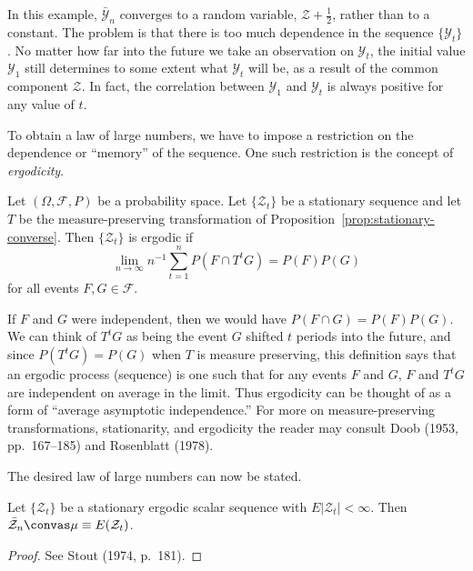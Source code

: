 In this example, $\bar{\mathcal{Y}}_n$ converges to a random variable, $\mathcal{Z} + \frac{1}{2}$, rather than to a constant. The problem is that there is too much dependence in the sequence $\{\mathcal{Y}_t\}$. No matter how far into the future we take an observation on $\mathcal{Y}_t$, the initial value $\mathcal{Y}_1$ still determines to some extent what $\mathcal{Y}_t$ will be, as a result of the common component $\mathcal{Z}$. In fact, the correlation between $\mathcal{Y}_1$ and $\mathcal{Y}_t$ is always positive for any value of $t$.

To obtain a law of large numbers, we have to impose a restriction on the dependence or ``memory'' of the sequence. One such restriction is the concept of \emph{ergodicity}.

\begin{definition}\label{def:ergodic}
Let $(\Omega, \mathcal{F}, P)$ be a probability space. Let $\{\mathcal{Z}_t\}$ be a stationary sequence and let $T$ be the measure-preserving transformation of Proposition~\ref{prop:stationary-converse}. Then $\{\mathcal{Z}_t\}$ is ergodic if
\[
\lim_{n \to \infty} n^{-1} \sum_{t=1}^{n} P(F \cap T^t G) = P(F) P(G)
\]
for all events $F, G \in \mathcal{F}$.
\end{definition}

If $F$ and $G$ were independent, then we would have $P(F \cap G) = P(F) P(G)$. We can think of $T^t G$ as being the event $G$ shifted $t$ periods into the future, and since $P(T^t G) = P(G)$ when $T$ is measure preserving, this definition says that an ergodic process (sequence) is one such that for any events $F$ and $G$, $F$ and $T^t G$ are independent on average in the limit. Thus ergodicity can be thought of as a form of ``average asymptotic independence.'' For more on measure-preserving transformations, stationarity, and ergodicity the reader may consult Doob (1953, pp.~167--185) and Rosenblatt (1978).

The desired law of large numbers can now be stated.

\begin{theorem}\label{thm:ergodic}
Let $\{\mathcal{Z}_t\}$ be a stationary ergodic scalar sequence with $E|\mathcal{Z}_t| < \infty$. Then $\bar{\mathcal{Z}}_n \convas \mu \equiv E(\mathcal{Z}_t)$.
\end{theorem}

\begin{proof}
See Stout (1974, p.~181). \qedhere
\end{proof}

